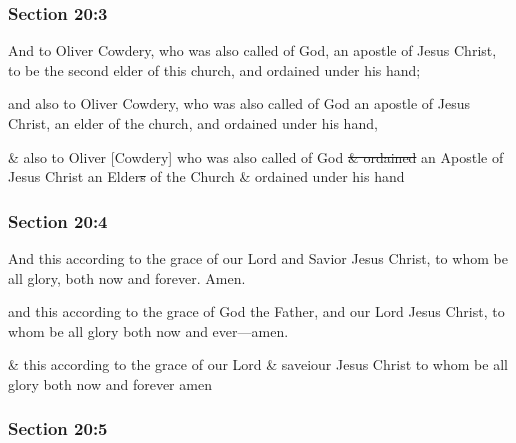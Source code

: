 	\subsubsection{Section 20:3} %
		\label{DC20-3}

		And to Oliver Cowdery, who was also called of God, an apostle of Jesus Christ, to be the second elder of this church, and ordained under his hand;

		\begin{framed}
		\scriptsize
			\begin{compactdesc}
				\item[JSP] and also to Oliver Cowdery, who was also called of God an apostle of Jesus Christ, an elder of the church, and ordained under his hand,
				\item[RB1] \& also to Oliver [Cowdery] who was also called of God \sout{\& ordained} an Apostle of Jesus Christ an Elder\sout{s} of the Church \& ordained under his hand
			\end{compactdesc}
		\end{framed}

	\subsubsection{Section 20:4} %
		\label{DC20-4}

		And this according to the grace of our Lord and Savior Jesus Christ, to whom be all glory, both now and forever. Amen.

		\begin{framed}
		\scriptsize
			\begin{compactdesc}
				\item[JSP] and this according to the grace of God the Father, and our Lord Jesus Christ, to whom be all glory both now and ever---amen.
				\item[RB1] \& this according to the grace of our Lord \& saveiour Jesus Christ to whom be all glory both now and forever amen
			\end{compactdesc}
		\end{framed}

	\subsubsection{Section 20:5} %
		\label{DC20-5}

